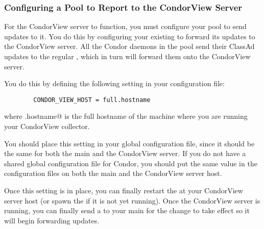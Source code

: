 \subsubsection{\label{sec:CondorView-Pool-Setup}
Configuring a Pool to Report to the CondorView Server} 

For the CondorView server to function, you must configure your pool to
send updates to it.
You do this by configuring your existing  to forward
its updates to the CondorView server.
All the Condor daemons in the pool send their ClassAd updates to the
regular , which in turn will forward them onto the
CondorView server.

You do this by defining the following setting in your configuration
file:
\begin{verbatim}
        CONDOR_VIEW_HOST = full.hostname
\end{verbatim}
where \verb@full.hostname@ is the full hostname of the machine where you
are running your CondorView collector.

You should place this setting in your global configuration file, since
it should be the same for both the main  and the
CondorView server.
If you do not have a shared global configuration file for Condor, you
should put the same value in the configuration files on both the main
 and the CondorView server host.

Once this setting is in place, you can finally restart the
 at your CondorView server host (or spawn the
 if it is not yet running).
Once the CondorView server is running, you can finally send a
 to your main  for the change to
take effect so it will begin forwarding updates.




